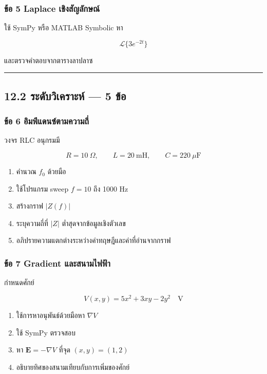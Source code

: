 \subsubsection{ข้อ 5 Laplace เชิงสัญลักษณ์}

ใช้ SymPy หรือ MATLAB Symbolic หา

\[
\mathcal{L}\{3e^{-2t}\}
\]

และตรวจคำตอบจากตารางลาปลาซ

\par\noindent\rule{\textwidth}{0.4pt}\par

\subsection{12.2 ระดับวิเคราะห์ — 5 ข้อ}

\subsubsection{ข้อ 6 อิมพีแดนซ์ตามความถี่}

วงจร RLC อนุกรมมี

\[
R=10\ \Omega,\qquad L=20\ \text{mH},\qquad C=220\ \mu\text{F}
\]

\begin{enumerate}
    \item คำนวณ $f_0$ ด้วยมือ
    \item ใช้โปรแกรม sweep $f=10$ ถึง 1000 Hz
    \item สร้างกราฟ $|Z(f)|$
    \item ระบุความถี่ที่ $|Z|$ ต่ำสุดจากข้อมูลเชิงตัวเลข
    \item อภิปรายความแตกต่างระหว่างค่าทฤษฎีและค่าที่อ่านจากกราฟ
\end{enumerate}

\subsubsection{ข้อ 7 Gradient และสนามไฟฟ้า}

กำหนดศักย์

\[
V(x,y)=5x^2+3xy-2y^2\quad \text{V}
\]

\begin{enumerate}
    \item ใช้การหาอนุพันธ์ด้วยมือหา $\nabla V$
    \item ใช้ SymPy ตรวจสอบ
    \item หา $\mathbf{E}=-\nabla V$ ที่จุด $(x,y)=(1,2)$
    \item อธิบายทิศของสนามเทียบกับการเพิ่มของศักย์
\end{enumerate}

